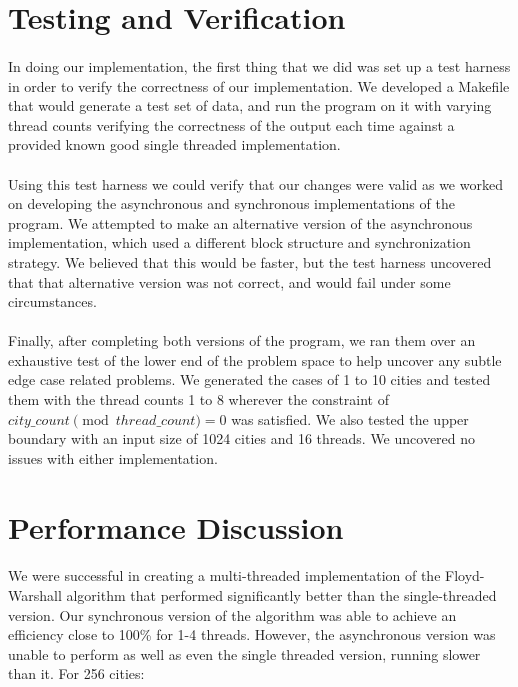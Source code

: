 \documentclass[12pt]{article}
\begin{document}
	\section{Testing and Verification}
	
	\paragraph{}
	In doing our implementation, the first thing that we did was set up a test harness in order to verify the correctness of our implementation. We developed a Makefile that would generate a test set of data, and run the program on it with varying thread counts verifying the correctness of the output each time against a provided known good single threaded implementation.
	
	\paragraph{}
	Using this test harness we could verify that our changes were valid as we worked on developing the asynchronous and synchronous implementations of the program. We attempted to make an alternative version  of the asynchronous implementation, which used a different block structure and synchronization strategy. We believed that this would be faster, but the test harness uncovered that that alternative version was not correct, and would fail under some circumstances.
	
	\paragraph{}
	Finally, after completing both versions of the program, we ran them over an exhaustive test of the lower end of the problem space to help uncover any subtle edge case related problems. We generated the cases of 1 to 10 cities and tested them with the thread counts 1 to 8 wherever the constraint of $city\_count \pmod{thread\_count} = 0$ was satisfied. We also tested the upper boundary with an input size of 1024 cities and 16 threads. We uncovered no issues with either implementation.
	
	\section{Performance Discussion}
	
	\paragraph{}
	We were successful in creating a multi-threaded implementation of the Floyd-Warshall algorithm that performed significantly better than the single-threaded version. Our synchronous version of the algorithm was able to achieve an efficiency close to 100\% for 1-4 threads. However, the asynchronous version was unable to perform as well as even the single threaded version, running slower than it. For 256 cities:
	
\end{document}
